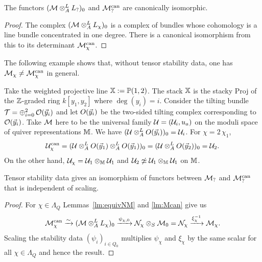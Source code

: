 \documentclass[12pt]{amsart}
\begin{document}
\begin{lemma}\label{lm:Mcan}
The functors $(\mathcal{M} \otimes_A^L L_?)_0$ and $\mathcal{M}_?^{\textup{can}}$ are canonically isomorphic.
\end{lemma}

\begin{proof}
The complex $(\mathcal{M} \otimes_A^L L_\chi)_0$ is a complex of bundles whose cohomology is a line bundle concentrated in one degree. 
There is a canonical isomorphism from this to its determinant $\mathcal{M}_{\chi}^{\text{can}}$.
\end{proof}

The following example shows that, without tensor stability data, one has $\mathcal{M}_\chi \neq \mathcal{M}_\chi^\text{can}$ in general.

\begin{example}
Take the weighted projective line $\mathbb{X}:=\mathbb{P}(1,2)$. 
The stack $\mathbb{X}$ is the stacky Proj of the $\mathbb{Z}$-graded ring $k[y_1,y_2]$ where $\deg(y_i)=i$.
Consider the tilting bundle $\mathcal{T}= \oplus_{i=0}^2 \,\mathcal{O}({\vec{y}}_i)$ and let $O({\vec{y}}_i)$ be the two-sided tilting complex corresponding to $\mathcal{O}({\vec{y}}_i)$. 
Take $\mathcal{M}$ here to be the universal family $\mathcal{U}=(\mathcal{U}_i, u_a)$ on the  moduli space of quiver representations $\mathbb{M}$.
We have $(\mathcal{U} \otimes_A^L O({\vec{y}}_i))_0 = \mathcal{U}_i$.
For $\chi= 2\,\chi_1$, $$\mathcal{U}_\chi^\text{can} = (\mathcal{U} \otimes_A^L O({\vec{y}}_1)\otimes_A^L O({\vec{y}}_1))_0 = (\mathcal{U} \otimes_A^L O({\vec{y}}_2))_0 = \mathcal{U}_2.$$
On the other hand, $\mathcal{U}_\chi = \mathcal{U}_1 \otimes_{\mathbb{M}} \mathcal{U}_1$ and $\mathcal{U}_2 \not\simeq \mathcal{U}_1 \otimes_{\mathbb{M}} \mathcal{U}_1$ on $\mathbb{M}$.
\end{example}

\begin{proposition}\label{prop:can}
Tensor stability data gives an isomorphism of functors between $\mathcal{M}_?$ and $\mathcal{M}_?^{\textup{can}}$ that is independent of scaling. 
\end{proposition}

\begin{proof}
For $\chi \in \Lambda_{Q}$ Lemmas~\ref{lm:equivNM} and \ref{lm:Mcan} give us
\begin{equation}\label{eq:phitog}
\mathcal{M}_\chi^\text{can} \xrightarrow{\sim} (\mathcal{M} \otimes_A^L L_\chi)_0 \xrightarrow{\psi_{\chi,0}} \mathcal{N}_\chi \otimes_S \mathcal{M}_0 = \mathcal{N}_\chi \xrightarrow{{\xi_\chi^{-1}}} \mathcal{M}_\chi.
\end{equation}
Scaling the stability data $(\psi_i)_{i\in Q_0}$ multiplies $\psi_\chi$ and $\xi_\chi$ by the same scalar for all $\chi \in \Lambda_Q$ and hence the result.
\end{proof}
\end{document}
